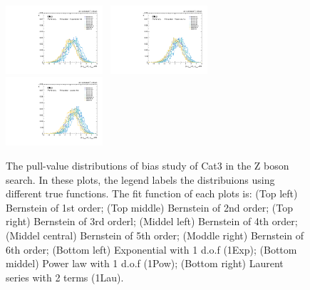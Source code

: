 \begin{figure}[p]
  \includegraphics[width=0.32\textwidth]{Fig/BiasStudy/Pull/ZJpsiG_Cat3/pull_fitfunc6_leastbias}~
  \includegraphics[width=0.32\textwidth]{Fig/BiasStudy/Pull/ZJpsiG_Cat3/pull_fitfunc7_leastbias}~
  \includegraphics[width=0.32\textwidth]{Fig/BiasStudy/Pull/ZJpsiG_Cat3/pull_fitfunc8_leastbias}\\
  \caption{The pull-value distributions of bias study of Cat3 in the Z boson search. In these plots, the legend labels the distribuions using different true functions. The fit function of each plots is: (Top left) Bernstein of 1st order; (Top middle) Bernstein of 2nd order; (Top right) Bernstein of 3rd orderl; (Middel left) Bernstein of 4th order; (Middel central) Bernstein of 5th order; (Moddle right) Bernstein of 6th order; (Bottom left) Exponential with 1 d.o.f (1Exp); (Bottom middel) Power law with 1 d.o.f (1Pow); (Bottom right) Laurent series with 2 terms (1Lau).}
  \label{fig:Pull_ZJpsiG_Cat3_v2}
\end{figure}


